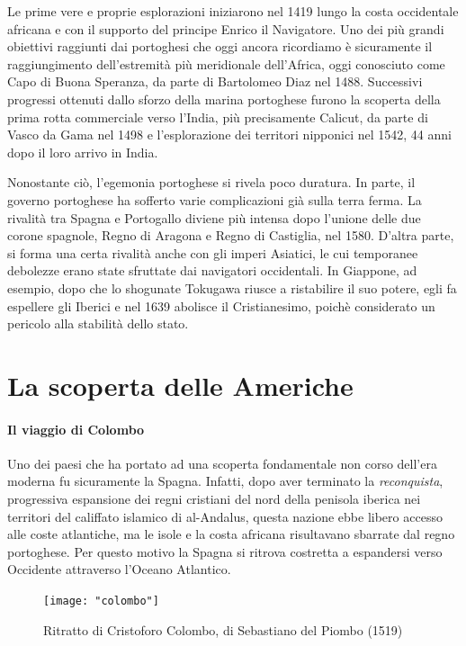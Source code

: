 \documentclass[11pt]{report}
\begin{document}
	Le prime vere e proprie esplorazioni iniziarono nel 1419 lungo la costa occidentale africana e con il supporto del principe Enrico il Navigatore. Uno dei più grandi obiettivi raggiunti dai portoghesi che oggi ancora ricordiamo è sicuramente il raggiungimento dell'estremità più meridionale dell'Africa, oggi conosciuto come Capo di Buona Speranza, da parte di Bartolomeo Diaz nel 1488. Successivi progressi ottenuti dallo sforzo della marina portoghese furono la scoperta della prima rotta commerciale verso l'India, più precisamente Calicut, da parte di Vasco da Gama nel 1498 e l'esplorazione dei territori nipponici nel 1542, 44 anni dopo il loro arrivo in India.
	
	Nonostante ciò, l'egemonia portoghese si rivela poco duratura. In parte, il governo portoghese ha sofferto varie complicazioni già sulla terra ferma. La rivalità tra Spagna e Portogallo diviene più intensa dopo l'unione delle due corone spagnole, Regno di Aragona e Regno di Castiglia, nel 1580. D'altra parte, si forma una certa rivalità anche con gli imperi Asiatici, le cui temporanee debolezze erano state sfruttate dai navigatori occidentali. In Giappone, ad esempio, dopo che lo shogunate Tokugawa riusce a ristabilire il suo potere, egli fa espellere gli Iberici e nel 1639 abolisce il Cristianesimo, poichè considerato un pericolo alla stabilità dello stato. \cite{o2005philip}
	
	\section*{La scoperta delle Americhe}
	
	\paragraph*{Il viaggio di Colombo}
	
	Uno dei paesi che ha portato ad una scoperta fondamentale non corso dell'era moderna fu sicuramente la Spagna. Infatti, dopo aver terminato la \textit{reconquista}, progressiva espansione dei regni cristiani del nord della penisola iberica nei territori del califfato islamico di al-Andalus, questa nazione ebbe libero accesso alle coste atlantiche, ma le isole e la costa africana risultavano sbarrate dal regno portoghese. Per questo motivo la Spagna si ritrova costretta a espandersi verso Occidente attraverso l'Oceano Atlantico.\\
	
	\begin{figure}
		\texttt{[image: "colombo"]}
		\caption{{\small Ritratto di Cristoforo Colombo, di Sebastiano del Piombo (1519)}}
	\end{figure} 
	
\end{document}
